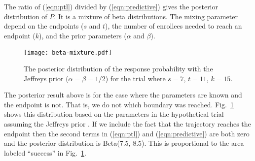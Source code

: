 \documentclass[review]{elsarticle}
\begin{document}
The ratio of (\ref{eqn:ptl}) divided by (\ref{eqn:predictive}) gives the 
posterior distribution of $P$. It is a mixture of beta distributions. The
mixing parameter depend on the endpoints ($s$ and $t$), the number of enrollees needed to reach an endpoint ($k$), and the prior parameters ($\alpha$ and
$\beta$).

\begin{figure}[t!]
\centering
\texttt{[image: beta-mixture.pdf]}
\caption{
The posterior distribution of the response probability with 
the Jeffreys prior ($\alpha=\beta=1/2$) for the trial where
$s=7$, $t=11$, $k=15$.
}
\label{fig:beta_mixture}
\end{figure}

The posterior result above is for the case where the parameters are known
and the endpoint is not. That is, we do not which boundary was reached.
Fig.~\ref{fig:beta_mixture} shows this distribution based on the 
parameters in the hypothetical trial assuming the
Jeffreys prior \citep{Jeffreys1946}.  If we include the fact that the
trajectory reaches the endpoint then the second terms in (\ref{eqn:ptl}) and
(\ref{eqn:predictive}) are both zero and the posterior distribution is
Beta(7.5, 8.5). This is proportional to the area labeled ``success'' in 
Fig.~\ref{fig:beta_mixture}.


%
%
\end{document}
